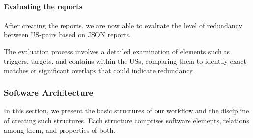 \paragraph{Evaluating the reports} After creating the reports, we are now able to evaluate the level of redundancy between US-pairs based on JSON reports.

The evaluation process involves a detailed examination of elements such as triggers, targets, and contains within the USs, comparing them to identify exact matches or significant overlaps that could indicate redundancy.

\subsubsection*{Software Architecture}\label{architectur}
In this section, we present the basic structures of our workflow and the discipline of creating such structures. Each structure comprises software elements, relations among them, and properties of both.
